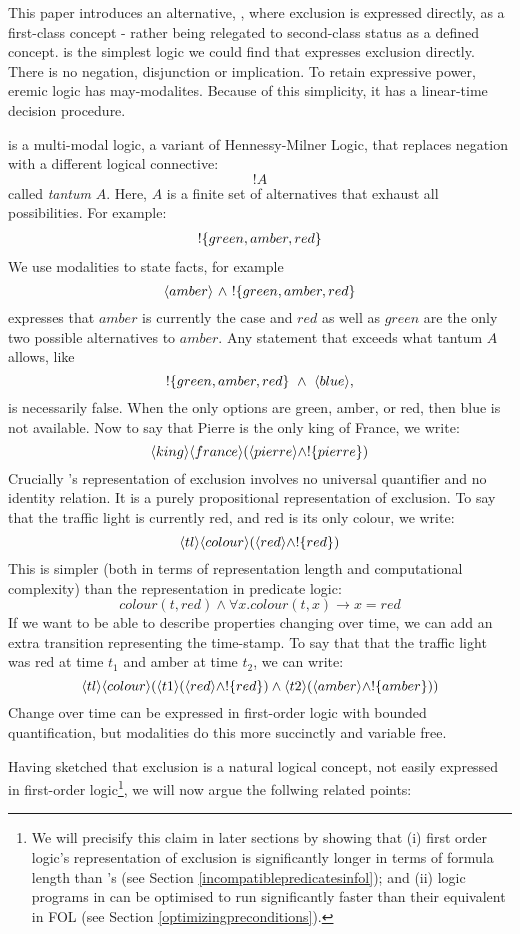 This paper introduces an alternative, \ELFULL{}, where exclusion is
expressed directly, as a first-class concept - rather being relegated
to second-class status as a defined concept. \ELFULL{} is the simplest
logic we could find that expresses exclusion directly.  There is no
negation, disjunction or implication. To retain expressive power,
eremic logic has may-modalites.  Because of this simplicity, it has a
linear-time decision procedure.

\ELFULL{} is a multi-modal logic, a variant of Hennessy-Milner Logic,
that replaces negation with a different logical connective:
\[
   !A
\]
called \emph{tantum} $A$. Here, $A$ is a finite set of alternatives
that exhaust all possibilities.  For example:
\begin{eqnarray*}
! \{green, amber, red\}
\end{eqnarray*}
We use modalities to state  facts, for example
\[
   \langle amber \rangle\ \land\ !\{green, amber, red\} 
\]
expresses that $amber$ is currently the case and $red$ as well as
$green$ are the only two possible alternatives to $amber$.  Any
statement that exceeds what tantum $A$ allows, like
\[
   !\{green, amber, red\}\ \AND\ \MAY{blue},
\]
is necessarily false.  When the only options are green, amber, or red,
then blue is not available.  Now to say that Pierre is the only king
of France, we write:
\[
\langle king \rangle \langle france \rangle (\langle pierre \rangle \land ! \{pierre\})
\]
Crucially \ELFULL{}'s representation of exclusion involves no
universal quantifier and no identity relation.  It is a purely
propositional representation of exclusion.  To say that the traffic
light is currently red, and red is its only colour, we write:
\[
\langle tl \rangle \langle colour \rangle (\langle red \rangle \land !\{red\})
\]
This is simpler (both in terms of representation length and
computational complexity) than the representation in predicate logic:
\[
colour(t, red) \land \forall x . colour(t, x) \rightarrow x = red
\]
If we want to be able to describe properties changing over time, we
can add an extra transition representing the time-stamp.  To say that
that the traffic light was red at time $t_1$ and amber at time $t_2$,
we can write:
\[
   \langle tl \rangle \langle colour \rangle (\langle t1 \rangle (\langle red \rangle \land !\{red\}) \land \langle t2 \rangle (\langle amber \rangle \land !\{amber\}))
\]
Change over time can be expressed in first-order logic with bounded
quantification, but modalities do this more succinctly and variable
free.

Having sketched that exclusion is a natural logical concept, not
easily expressed in first-order logic\footnote{We will precisify this
  claim in later sections by showing that (i) first order logic's
  representation of exclusion is significantly longer in terms of
  formula length than \ELFULL{}'s (see Section
  \ref{incompatiblepredicatesinfol}); and (ii) logic programs in
  \ELFULL{} can be optimised to run significantly faster than their
  equivalent in FOL (see Section \ref{optimizingpreconditions}).},  we
will now argue the follwing related points:

